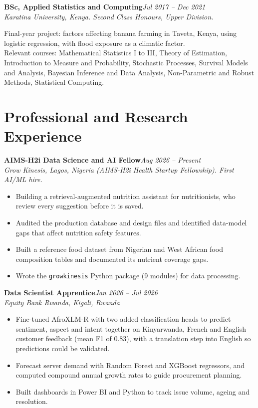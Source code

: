 \documentclass[10pt,a4paper]{article}
\newcommand{\entry}[3]{%
  \textbf{#1}\hfill\textit{#2}\\
  \textit{#3}\par\vspace{0.2ex}}
\begin{document}
\vspace{0.8ex}
\entry{BSc, Applied Statistics and Computing}{Jul 2017 -- Dec 2021}
{Karatina University, Kenya. Second Class Honours, Upper Division.}
Final-year project: factors affecting banana farming in Taveta, Kenya, using logistic regression, with flood exposure as a climatic factor.\\
Relevant courses: Mathematical Statistics I to III, Theory of Estimation, Introduction to Measure and Probability, Stochastic Processes, Survival Models and Analysis, Bayesian Inference and Data Analysis, Non-Parametric and Robust Methods, Statistical Computing.

\section{Professional and Research Experience}
\entry{AIMS-H2i Data Science and AI Fellow}{Aug 2026 -- Present}
{Grow Kinesis, Lagos, Nigeria (AIMS-H2i Health Startup Fellowship). First AI/ML hire.}
\begin{itemize}
  \item Building a retrieval-augmented nutrition assistant for nutritionists, who review every suggestion before it is saved.
  \item Audited the production database and design files and identified data-model gaps that affect nutrition safety features.
  \item Built a reference food dataset from Nigerian and West African food composition tables and documented its nutrient coverage gaps.
  \item Wrote the \texttt{growkinesis} Python package (9 modules) for data processing.
\end{itemize}

\entry{Data Scientist Apprentice}{Jan 2026 -- Jul 2026}{Equity Bank Rwanda, Kigali, Rwanda}
\begin{itemize}
  \item Fine-tuned AfroXLM-R with two added classification heads to predict sentiment, aspect and intent together on Kinyarwanda, French and English customer feedback (mean F1 of 0.83), with a translation step into English so predictions could be validated.
  \item Forecast server demand with Random Forest and XGBoost regressors, and computed compound annual growth rates to guide procurement planning.
  \item Built dashboards in Power BI and Python to track issue volume, ageing and resolution.
\end{itemize}
\end{document}
